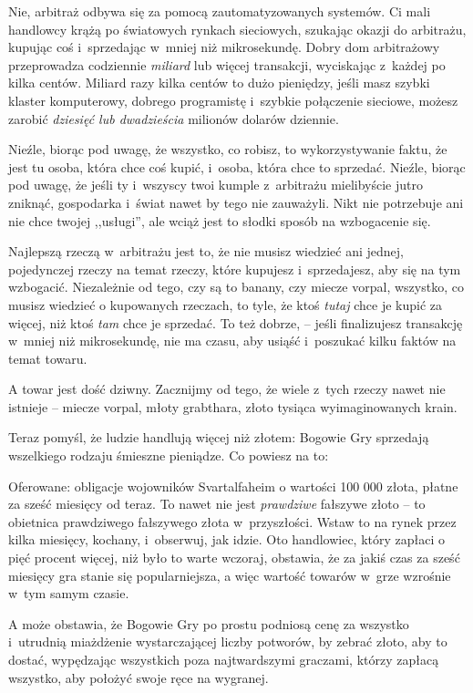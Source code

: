 \documentclass[oneside,polish,11pt,rmheadings]{mwbk}
\begin{document}
Nie, arbitraż odbywa się za pomocą zautomatyzowanych systemów. Ci mali handlowcy krążą po światowych rynkach sieciowych, szukając okazji do arbitrażu, kupując coś i~sprzedając w~mniej niż mikrosekundę. Dobry dom arbitrażowy przeprowadza codziennie \textit{miliard }lub więcej transakcji, wyciskając z~każdej po kilka centów. Miliard razy kilka centów to dużo pieniędzy, jeśli masz szybki klaster komputerowy, dobrego programistę i~szybkie połączenie sieciowe, możesz zarobić \textit{dziesięć lub dwadzieścia }milionów dolarów dziennie. 


Nieźle, biorąc pod uwagę, że wszystko, co robisz, to wykorzystywanie faktu, że jest tu osoba, która chce coś kupić, i~osoba, która chce to sprzedać. Nieźle, biorąc pod uwagę, że jeśli ty i~wszyscy twoi kumple z~arbitrażu mielibyście jutro zniknąć, gospodarka i~świat nawet by tego nie zauważyli. Nikt nie potrzebuje ani nie chce twojej ,,usługi'', ale wciąż jest to słodki sposób na wzbogacenie się. 


Najlepszą rzeczą w~arbitrażu jest to, że nie musisz wiedzieć ani jednej, pojedynczej rzeczy na temat rzeczy, które kupujesz i~sprzedajesz, aby się na tym wzbogacić. Niezależnie od tego, czy są to banany, czy miecze vorpal, wszystko, co musisz wiedzieć o kupowanych rzeczach, to tyle, że ktoś \textit{tutaj }chce je kupić za więcej, niż ktoś \textit{tam }chce je sprzedać. To też dobrze, -- jeśli finalizujesz transakcję w~mniej niż mikrosekundę, nie ma czasu, aby usiąść i~poszukać kilku faktów na temat towaru. 


A towar jest dość dziwny. Zacznijmy od tego, że wiele z~tych rzeczy nawet nie istnieje -- miecze vorpal, młoty grabthara, złoto tysiąca wyimaginowanych krain. 


Teraz pomyśl, że ludzie handlują więcej niż złotem: Bogowie Gry sprzedają wszelkiego rodzaju śmieszne pieniądze. Co powiesz na to: 


Oferowane: obligacje wojowników Svartalfaheim o wartości 100 000 złota, płatne za sześć miesięcy od teraz. To nawet nie jest \textit{prawdziwe }fałszywe złoto -- to obietnica prawdziwego fałszywego złota w~przyszłości. Wstaw to na rynek przez kilka miesięcy, kochany, i~obserwuj, jak idzie. Oto handlowiec, który zapłaci o pięć procent więcej, niż było to warte wczoraj, obstawia, że za jakiś czas za sześć miesięcy gra stanie się popularniejsza, a więc wartość towarów w~grze wzrośnie w~tym samym czasie. 


A może obstawia, że Bogowie Gry po prostu podniosą cenę za wszystko i~utrudnią miażdżenie wystarczającej liczby potworów, by zebrać złoto, aby to dostać, wypędzając wszystkich poza najtwardszymi graczami, którzy zapłacą wszystko, aby położyć swoje ręce na wygranej. 
\end{document}
